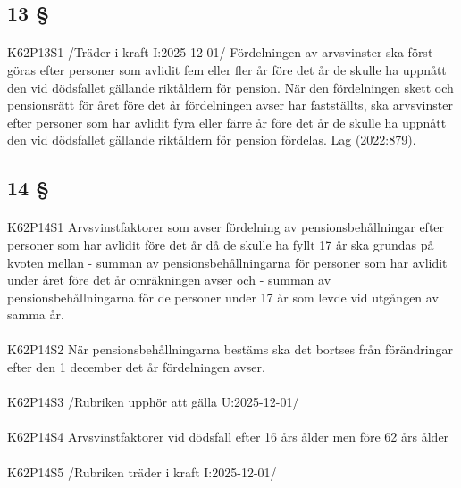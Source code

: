 \documentclass[a4paper,notitlepage,openany,10pt]{book}
\begin{document}
\subsection*{13 §}
\paragraph*{}
{\tiny K62P13S1}
/Träder i kraft I:2025-12-01/
Fördelningen av arvsvinster ska först göras efter personer som avlidit fem eller fler år före det år de skulle ha uppnått den vid dödsfallet gällande riktåldern för pension. När den fördelningen skett och pensionsrätt för året före det år fördelningen avser har fastställts, ska arvsvinster efter personer som har avlidit fyra eller färre år före det år de skulle ha uppnått den vid dödsfallet gällande riktåldern för pension fördelas.
Lag (2022:879).
\subsection*{14 §}
\paragraph*{}
{\tiny K62P14S1}
Arvsvinstfaktorer som avser fördelning av pensionsbehållningar efter personer som har avlidit före det år då de skulle ha fyllt 17 år ska grundas på kvoten mellan
\newline - summan av pensionsbehållningarna för personer som har avlidit under året före det år omräkningen avser och
\newline - summan av pensionsbehållningarna för de personer under 17 år som levde vid utgången av samma år.
\paragraph*{}
{\tiny K62P14S2}
När pensionsbehållningarna bestäms ska det bortses från förändringar efter den 1 december det år fördelningen avser.
\paragraph*{}
{\tiny K62P14S3}
/Rubriken upphör att gälla U:2025-12-01/
\paragraph*{}
{\tiny K62P14S4}
Arvsvinstfaktorer vid dödsfall efter 16 års ålder men före 62 års ålder
\paragraph*{}
{\tiny K62P14S5}
/Rubriken träder i kraft I:2025-12-01/
\end{document}
